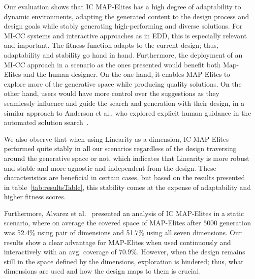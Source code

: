 Our evaluation shows that IC MAP-Elites has a high degree of adaptability to dynamic environments, adapting the generated content to the design process and design goals while stably generating high-performing and diverse solutions. For MI-CC systems and interactive approaches as in EDD, this is especially relevant and important. The fitness function adapts to the current design; thus, adaptability and stability go hand in hand. Furthermore, the deployment of an MI-CC approach in a scenario as the ones presented would benefit both Map-Elites and the human designer. On the one hand, it enables MAP-Elites to explore more of the generative space while producing quality solutions. On the other hand, users would have more control over the suggestions as they seamlessly influence and guide the search and generation with their design, in a similar approach to Anderson et al., who explored explicit human guidance in the automated solution search~. 


We also observe that when using Linearity as a dimension, IC MAP-Elites performed quite stably in all our scenarios regardless of the design traversing around the generative space or not, which indicates that Linearity is more robust and stable and more agnostic and independent from the design. These characteristics are beneficial in certain cases, but based on the results presented in table~\ref{tab:resultsTable}, this stability comes at the expense of adaptability and higher fitness scores.

Furthermore, Alvarez et al.~ presented an analysis of IC MAP-Elites in a static scenario, where on average the covered space of MAP-Elites after $5000$ generation was 52.4\% using pair of dimensions and 51.7\% using all seven dimensions. Our results show a clear advantage for MAP-Elites when used continuously and interactively with an avg. coverage of 70.9\%. However, when the design remains still in the space defined by the dimensions, exploration is hindered; thus, what dimensions are used and how the design maps to them is crucial.


